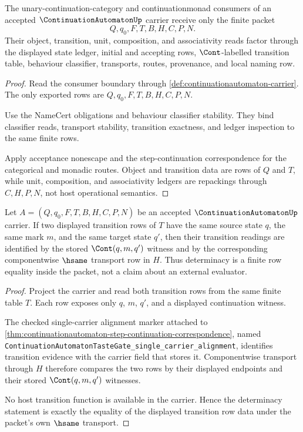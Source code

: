 \begin{theorem}
\label{thm:continuation-automaton-ledger-factorization}
The unary-continuation-category and continuationmonad consumers of an accepted $\ContinuationAutomatonUp$ carrier receive only the finite packet
$$
Q,q_0,F,T,B,H,C,P,N.
$$
Their object, transition, unit, composition, and associativity reads factor through the displayed state ledger, initial and accepting rows, $\Cont$-labelled transition table, behaviour classifier, transports, routes, provenance, and local naming row.
\end{theorem}
\begin{proof}
Read the consumer boundary through \autoref{def:continuationautomaton-carrier}. The only exported rows are $Q,q_0,F,T,B,H,C,P,N$.

Use the NameCert obligations and behaviour classifier stability. They bind classifier reads, transport stability, transition exactness, and ledger inspection to the same finite rows.

Apply acceptance nonescape and the step-continuation correspondence for the categorical and monadic routes. Object and transition data are rows of $Q$ and $T$, while unit, composition, and associativity ledgers are repackings through $C,H,P,N$, not host operational semantics.
\end{proof}

\begin{theorem}\label{thm:continuation-automaton-transition-determinacy}
Let $A=(Q,q_0,F,T,B,H,C,P,N)$ be an accepted $\ContinuationAutomatonUp$ carrier. If two displayed transition rows of $T$ have the same source state $q$, the same mark $m$, and the same target state $q'$, then their transition readings are identified by the stored $\Cont(q,m,q')$ witness and by the corresponding componentwise $\hsame$ transport row in $H$. Thus determinacy is a finite row equality inside the packet, not a claim about an external evaluator.
\end{theorem}
\begin{proof}
Project the carrier and read both transition rows from the same finite table $T$. Each row exposes only $q$, $m$, $q'$, and a displayed continuation witness.

The checked single-carrier alignment marker attached to \autoref{thm:continuationautomaton-step-continuation-correspondence}, named \texttt{ContinuationAutomatonTasteGate\_single\_carrier\_alignment}, identifies transition evidence with the carrier field that stores it. Componentwise transport through $H$ therefore compares the two rows by their displayed endpoints and their stored $\Cont(q,m,q')$ witnesses.

No host transition function is available in the carrier. Hence the determinacy statement is exactly the equality of the displayed transition row data under the packet's own $\hsame$ transport.
\end{proof}

